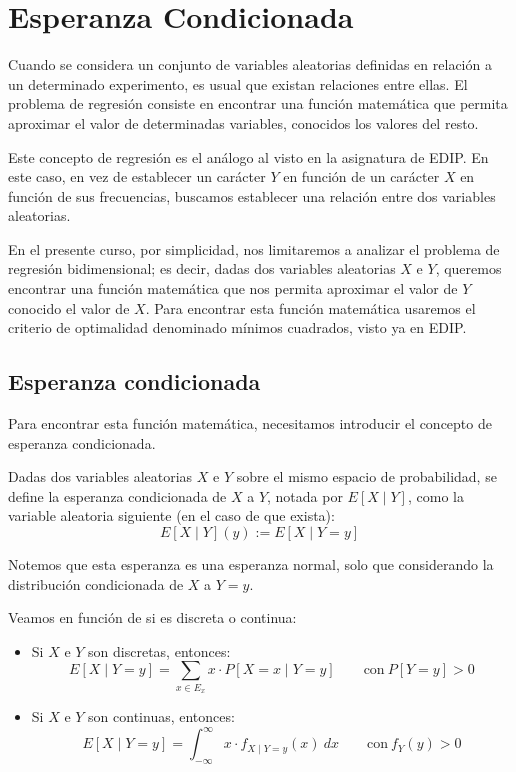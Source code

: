 \chapter{Esperanza Condicionada}

Cuando se considera un conjunto de variables aleatorias definidas en relación a un determinado experimento, es usual que existan relaciones entre ellas. El problema de regresión consiste en encontrar una función matemática que permita aproximar el valor de determinadas variables, conocidos los valores del resto.
\begin{observacion}
    Este concepto de regresión es el análogo al visto en la asignatura de EDIP. En este caso, en vez de establecer un carácter $Y$ en función de un carácter $X$ en función de sus frecuencias, buscamos establecer una relación entre dos variables aleatorias.
\end{observacion}

En el presente curso, por simplicidad, nos limitaremos a analizar el problema de regresión bidimensional; es decir, dadas dos variables aleatorias $X$ e $Y$, queremos encontrar una función matemática que nos permita aproximar el valor de $Y$ conocido el valor de $X$. Para encontrar esta función matemática usaremos el criterio de optimalidad denominado mínimos cuadrados, visto ya en EDIP.

\section{Esperanza condicionada}
Para encontrar esta función matemática, necesitamos introducir el concepto de esperanza condicionada.
\begin{definicion}
    Dadas dos variables aleatorias $X$ e $Y$ sobre el mismo espacio de probabilidad, se define la esperanza condicionada de $X$ a $Y$, notada por $E[X\mid Y]$, como la variable aleatoria siguiente (en el caso de que exista):
    \begin{equation*}
        E[X\mid Y](y) := E[X\mid Y = y]
    \end{equation*}

    Notemos que esta esperanza es una esperanza normal, solo que considerando la distribución condicionada de $X$ a $Y = y$.
\end{definicion}
Veamos en función de si es discreta o continua:
\begin{itemize}
    \item Si $X$ e $Y$ son discretas, entonces:
    \begin{equation*}
        E[X\mid Y = y] = \sum_{x\in E_x} x\cdot P[X = x\mid Y = y] \qquad \text{con}~P[Y=y]>0
    \end{equation*}
    \item Si $X$ e $Y$ son continuas, entonces:
    \begin{equation*}
        E[X\mid Y = y] = \int_{-\infty}^{\infty} x\cdot f_{X\mid Y=y}(x)~dx \qquad \text{con}~f_Y(y)>0
    \end{equation*}
\end{itemize}


